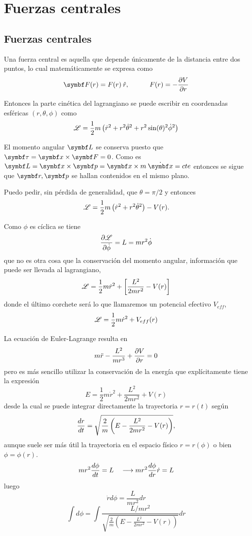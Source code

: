 \documentclass[10pt,oneside]{CBFT_book}
\begin{document}

\chapter{Fuerzas centrales}

\section{Fuerzas centrales}

Una fuerza central es aquella que depende únicamente de la distancia entre dos puntos, lo cual 
matemáticamente se expresa como
\[
	\vb{F}(r) = F(r) \:\hat{r}, \quad \qquad F(r) = - \dpar{V}{r}
\]

Entonces la parte cinética del lagrangiano se puede escribir en coordenadas esféricas $(r,\theta,\phi)$ como
\[
	\mathscr{L} = \frac{1}{2}m \left( \dot{r}^2 + r^2 \dot{\theta}^2 + r^2 \sin(\theta)^2\dot{\phi}^2 \right)
\]

El momento angular $\vb{L}$ se conserva puesto que $\vb{\tau} = \vb{x} \times \vb{F}=0$. Como es 
$\vb{L} = \vb{x} \times \vb{p} = \vb{x} \times m \: \dot{\vb{x}} = cte$ entonces se sigue que $\vb{r},\vb{p}$
se hallan contenidos en el mismo plano.

Puedo pedir, sin pérdida de generalidad, que $\theta=\pi/2$ y entonces 
\[
	\mathscr{L} = \frac{1}{2}m \left( \dot{r}^2 + r^2 \dot{\theta}^2 \right) - V(r).
\]

Como $\phi$ es cíclica se tiene
\[
	\frac{\partial^{\hspace{-0.05em}} {\mathscr{L}}}{\partial {\dot{\phi}}^{\hspace{-0.05em}}} = L = mr^2\dot{\phi}
\]
que no es otra cosa que la conservación del momento angular, información que puede ser llevada al
lagrangiano,
\[
	\mathscr{L} = \frac{1}{2}m \dot{r}^2 + \left[ \frac{L^2}{2 m r^2} - V(r) \right]
\]
donde el último corchete será lo que llamaremos un potencial efectivo $V_{eff}$,
\[
	\mathscr{L} = \frac{1}{2}m \dot{r}^2 + V_{eff}(r)
\]

La ecuación de Euler-Lagrange resulta en
\[
	m\ddot{r} - \frac{L^2}{mr^3} + \frac{\partial^{\hspace{-0.05em}} {V}}{\partial {r}^{\hspace{-0.05em}}} = 0
\]
pero es más sencillo utilizar la conservación de la energía que explícitamente tiene la expresión
\[
	E = \frac{1}{2}m \dot{r}^2 + \frac{L^2}{2 m r^2} + V(r)
\]
desde la cual se puede integrar directamente la trayectoria $r=r(t)$ según
\[
	\frac{d^{\hspace{-0.05em}} {r}}{d {t}^{\hspace{-0.05em}}} = \sqrt{ \frac{2}{m}\left( E - \frac{L^2}{2 m r^2} - V(r) \right)},
\]
aunque suele ser más útil la trayectoria en el espacio físico $r=r(\phi)$ o bien $\phi=\phi(r)$.
\[
	m r^2 \frac{d^{\hspace{-0.05em}} {\phi}}{d {t}^{\hspace{-0.05em}}} = L \quad \longrightarrow m r^2 \frac{d^{\hspace{-0.05em}} {\phi}}{d {r}^{\hspace{-0.05em}}} \dot{r} = L
\]
luego
\[
	\dot{r} d\phi = \frac{L}{m r^2} dr
\]
\[
	\int d\phi = \int \frac{L/mr^2}{\sqrt{ \frac{2}{m}\left( E - \frac{L^2}{2 m r^2} - V(r) \right)}}dr
\]
\end{document}
